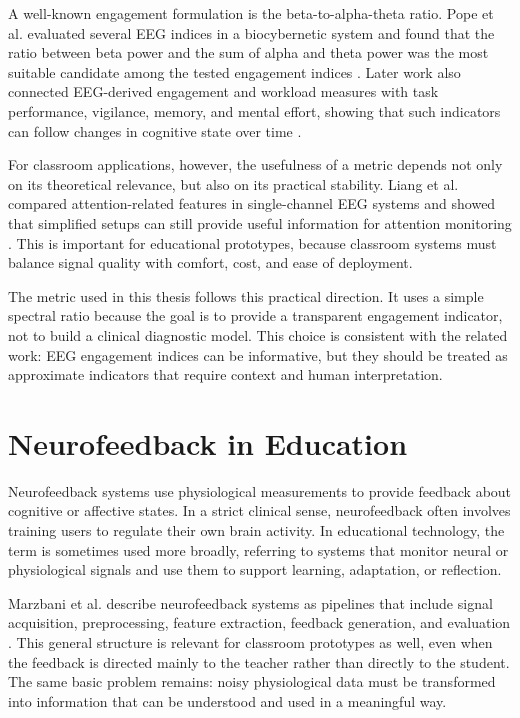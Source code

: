 A well-known engagement formulation is the beta-to-alpha-theta ratio. Pope et al. evaluated several EEG indices in a biocybernetic system and found that the ratio between beta power and the sum of alpha and theta power was the most suitable candidate among the tested engagement indices \cite{Pope1995}. Later work also connected EEG-derived engagement and workload measures with task performance, vigilance, memory, and mental effort, showing that such indicators can follow changes in cognitive state over time \cite{Berka2007}.


For classroom applications, however, the usefulness of a metric depends not only on its theoretical relevance, but also on its practical stability. Liang et al. compared attention-related features in single-channel EEG systems and showed that simplified setups can still provide useful information for attention monitoring \cite{Liang2022}. This is important for educational prototypes, because classroom systems must balance signal quality with comfort, cost, and ease of deployment.


The metric used in this thesis follows this practical direction. It uses a simple spectral ratio because the goal is to provide a transparent engagement indicator, not to build a clinical diagnostic model. This choice is consistent with the related work: EEG engagement indices can be informative, but they should be treated as approximate indicators that require context and human interpretation.

\section{Neurofeedback in Education}\label{sect:neurfbedu}
Neurofeedback systems use physiological measurements to provide feedback about cognitive or affective states. In a strict clinical sense, neurofeedback often involves training users to regulate their own brain activity. In educational technology, the term is sometimes used more broadly, referring to systems that monitor neural or physiological signals and use them to support learning, adaptation, or reflection.


Marzbani et al. describe neurofeedback systems as pipelines that include signal acquisition, preprocessing, feature extraction, feedback generation, and evaluation \cite{Marzbani2016}. This general structure is relevant for classroom prototypes as well, even when the feedback is directed mainly to the teacher rather than directly to the student. The same basic problem remains: noisy physiological data must be transformed into information that can be understood and used in a meaningful way.


